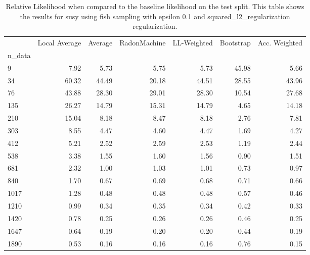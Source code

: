 \begin{table}
\centering
\caption{Relative Likelihood when compared to the baseline likelihood on the test split. This table shows the results for  susy using  fish sampling with epsilon  0.1 and  squared_l2_regularization regularization.}
\label{tab:14}
\begin{tabular}{lrrrrrr}
\toprule
{} &  Local Average &  Average &  RadonMachine &  LL-Weighted &  Bootstrap &  Acc. Weighted \\
n\_data &                &          &               &              &            &                \\
\midrule
9      &           7.92 &     5.73 &          5.75 &         5.73 &      45.98 &           5.66 \\
34     &          60.32 &    44.49 &         20.18 &        44.51 &      28.55 &          43.96 \\
76     &          43.88 &    28.30 &         29.01 &        28.30 &      10.54 &          27.68 \\
135    &          26.27 &    14.79 &         15.31 &        14.79 &       4.65 &          14.18 \\
210    &          15.04 &     8.18 &          8.47 &         8.18 &       2.76 &           7.81 \\
303    &           8.55 &     4.47 &          4.60 &         4.47 &       1.69 &           4.27 \\
412    &           5.21 &     2.52 &          2.59 &         2.53 &       1.19 &           2.44 \\
538    &           3.38 &     1.55 &          1.60 &         1.56 &       0.90 &           1.51 \\
681    &           2.32 &     1.00 &          1.03 &         1.01 &       0.73 &           0.97 \\
840    &           1.70 &     0.67 &          0.69 &         0.68 &       0.71 &           0.66 \\
1017   &           1.28 &     0.48 &          0.48 &         0.48 &       0.57 &           0.46 \\
1210   &           0.99 &     0.34 &          0.35 &         0.34 &       0.42 &           0.33 \\
1420   &           0.78 &     0.25 &          0.26 &         0.26 &       0.46 &           0.25 \\
1647   &           0.64 &     0.19 &          0.20 &         0.20 &       0.44 &           0.19 \\
1890   &           0.53 &     0.16 &          0.16 &         0.16 &       0.76 &           0.15 \\
\bottomrule
\end{tabular}
\end{table}
